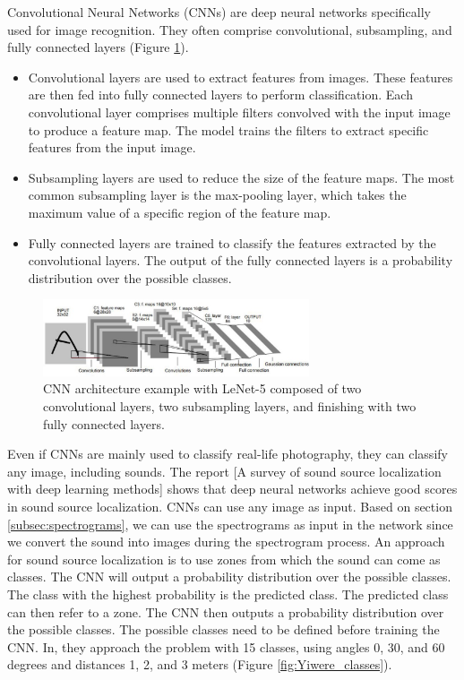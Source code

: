 Convolutional Neural Networks (CNNs)\cite{oshea2015introduction} are deep neural networks specifically used for image recognition. They often comprise convolutional, subsampling, and fully connected layers (Figure \ref*{fig:cnn_example}).
\begin{itemize}
    \item{} Convolutional layers are used to extract features from images. These features are then fed into fully connected layers to perform classification. Each convolutional layer comprises multiple filters convolved with the input image to produce a feature map. The model trains the filters to extract specific features from the input image.
    \item{} Subsampling layers are used to reduce the size of the feature maps. The most common subsampling layer is the max-pooling layer, which takes the maximum value of a specific region of the feature map.
    \item{} Fully connected layers are trained to classify the features extracted by the convolutional layers. The output of the fully connected layers is a probability distribution over the possible classes. 
\end{itemize}

\begin{figure}[H]
    \centering
    \includegraphics[width=0.7\textwidth]{../Images/cnn_example.png}
    \caption{CNN architecture example with LeNet-5 \protect\cite{726791} composed of two convolutional layers, two subsampling layers, and finishing with two fully connected layers.}
    \label{fig:cnn_example}
\end{figure}

Even if CNNs are mainly used to classify real-life photography, they can classify any image, including sounds. The report [A survey of sound source localization with deep learning methods]\cite{Grumiaux_2022} shows that deep neural networks achieve good scores in sound source localization. CNNs can use any image as input. Based on section \ref*{subsec:spectrograms}, we can use the spectrograms as input in the network since we convert the sound into images during the spectrogram process. An approach for sound source localization is to use zones from which the sound can come as classes. The CNN will output a probability distribution over the possible classes. The class with the highest probability is the predicted class. The predicted class can then refer to a zone. The CNN then outputs a probability distribution over the possible classes. The possible classes need to be defined before training the CNN. In\cite{s20010172}, they approach the problem with 15 classes, using angles 0, 30, and 60 degrees and distances 1, 2, and 3 meters (Figure \ref*{fig:Yiwere_classes}).


